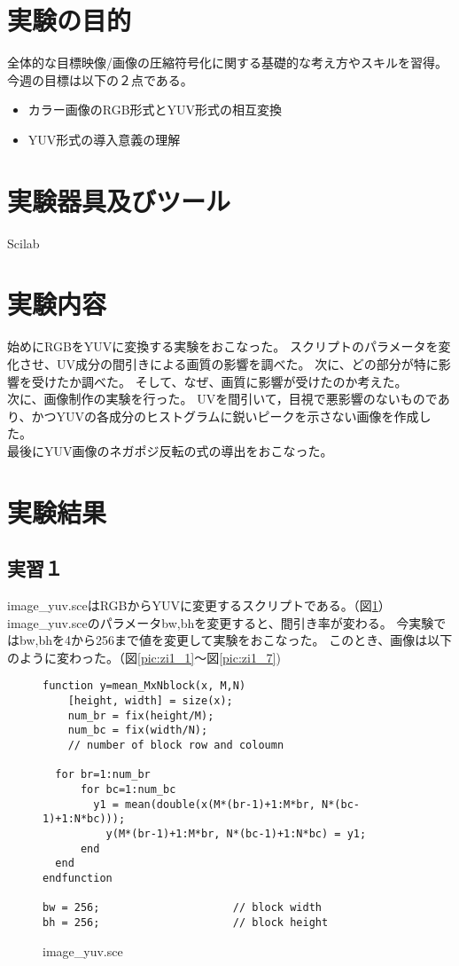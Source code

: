 \documentclass[a4j]{jsarticle}
\begin{document}
\section{実験の目的\cite{cite:object}}
全体的な目標映像/画像の圧縮符号化に関する基礎的な考え方やスキルを習得。
今週の目標は以下の２点である。
\begin{itemize}
  \item カラー画像のRGB形式とYUV形式の相互変換
  \item YUV形式の導入意義の理解
\end{itemize}

\section{実験器具及びツール}
Scilab

\section{実験内容\cite{cite:way}}
始めにRGBをYUVに変換する実験をおこなった。
スクリプトのパラメータを変化させ、UV成分の間引きによる画質の影響を調べた。
次に、どの部分が特に影響を受けたか調べた。
そして、なぜ、画質に影響が受けたのか考えた。\\
次に、画像制作の実験を行った。
UVを間引いて，目視で悪影響のないものであり、かつYUVの各成分のヒストグラムに鋭いピークを示さない画像を作成した。\\
最後にYUV画像のネガポジ反転の式の導出をおこなった。

\section{実験結果}
\subsection{実習１}
image\_yuv.sceはRGBからYUVに変更するスクリプトである。（図\ref{code:image_yuv.sce}）
image\_yuv.sceのパラメータbw,bhを変更すると、間引き率が変わる。
今実験ではbw,bhを4から256まで値を変更して実験をおこなった。
このとき、画像は以下のように変わった。（図\ref{pic:zi1_1}～図\ref{pic:zi1_7})

\begin{figure}[H]
  \begin{lstlisting}
function y=mean_MxNblock(x, M,N)
    [height, width] = size(x);
    num_br = fix(height/M);
    num_bc = fix(width/N);
    // number of block row and coloumn

  for br=1:num_br
      for bc=1:num_bc
        y1 = mean(double(x(M*(br-1)+1:M*br, N*(bc-1)+1:N*bc)));
          y(M*(br-1)+1:M*br, N*(bc-1)+1:N*bc) = y1;
      end
  end
endfunction

bw = 256;                     // block width
bh = 256;                     // block height

  \end{lstlisting}
  \caption{image\_yuv.sce}
  \label{code:image_yuv.sce}
\end{figure}
\end{document}
